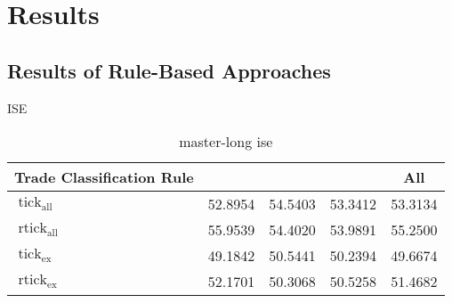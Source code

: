 \section{Results}\label{sec:results}

\subsection{Results of Rule-Based Approaches}\label{sec:result-of-rule-based-approaches}

\gls{ISE}
\begin{table}[H]
    \centering
    \caption[master-short]{master-long ise}
    \label{tab:ise_supervised_all-master}
    \begin{tabular}{@{}p{5.7cm}SSSS@{}}
        \toprule
        {Trade Classification Rule}                                                                                                                                                                                                                            & {} & {} & {} & {All}             \\\midrule
        $\operatorname{tick}_{\mathrm{all}}$                                                                                                                                                                                                                   & 52.8954                      & 54.5403           & 53.3412           & 53.3134           \\
        $\operatorname{rtick}_{\mathrm{all}}$                                                                                                                                                                                                                  & 55.9539                      & 54.4020           & 53.9891           & 55.2500           \\ \midrule
        $\operatorname{tick}_{\mathrm{ex}}$                                                                                                                                                                                                                    & 49.1842                      & 50.5441           & 50.2394           & 49.6674           \\
        $\operatorname{rtick}_{\mathrm{ex}}$                                                                                                                                                                                                                   & 52.1701                      & 50.3068           & 50.5258           & 51.4682           \\

\end{tabular}
\end{table}
